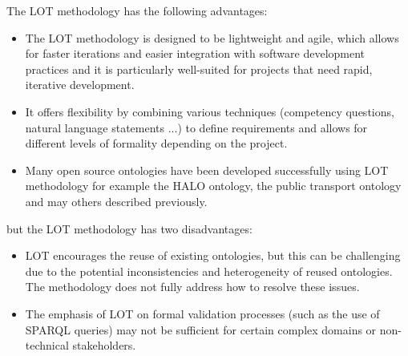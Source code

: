 The LOT methodology has the following advantages:
\begin{itemize}
    \item The LOT methodology is designed to be lightweight and agile, which allows for faster iterations and easier integration with software development practices and it is particularly well-suited for projects that need rapid, iterative development.

    \item It offers flexibility by combining various techniques (competency questions, natural language statements ...) to define requirements and allows for different levels of formality depending on the project.

    \item Many open source ontologies have been developed successfully using LOT methodology for example the HALO ontology, the public transport ontology and may others described previously.
\end{itemize}
but the LOT methodology has two disadvantages:
\begin{itemize}
    \item LOT encourages the reuse of existing ontologies, but this can be challenging due to the potential inconsistencies and heterogeneity of reused ontologies. The methodology does not fully address how to resolve these issues.

    \item The emphasis of LOT on formal validation processes (such as the use of SPARQL queries) may not be sufficient for certain complex domains or non-technical stakeholders.
\end{itemize}

